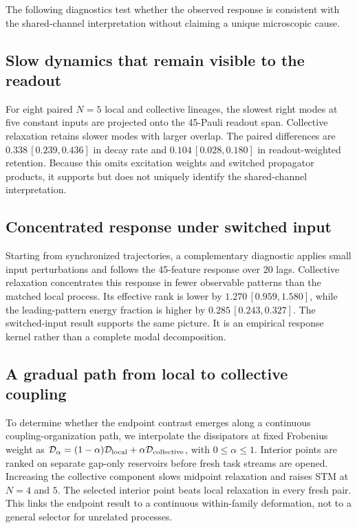 The following diagnostics test whether the observed response is consistent
with the shared-channel interpretation without claiming a unique microscopic
cause.

\subsection{Slow dynamics that remain visible to the readout}

For eight paired \(N=5\) local and collective lineages, the slowest right modes at five
constant inputs are projected onto the 45-Pauli readout span.  Collective
relaxation retains slower modes with larger overlap.  The paired differences
are \(0.338\,[0.239,0.436]\) in decay rate and
\(0.104\,[0.028,0.180]\) in readout-weighted retention. Because this omits
excitation weights and switched propagator products, it supports but does not
uniquely identify the shared-channel interpretation.

\subsection{Concentrated response under switched input}

Starting from synchronized trajectories, a complementary diagnostic applies
small input perturbations and follows the 45-feature response over 20 lags.
Collective relaxation concentrates this response in fewer observable
patterns than the matched local process.  Its effective rank is lower by
\(1.270\,[0.959,1.580]\), while the leading-pattern energy fraction is higher
by \(0.285\,[0.243,0.327]\).  The switched-input result supports the same
picture.  It is an empirical response kernel rather than a complete modal
decomposition.

\subsection{A gradual path from local to collective coupling}

To determine whether the endpoint contrast emerges along a continuous
coupling-organization path, we interpolate the dissipators at fixed Frobenius weight as
\(\mathcal{D}_\alpha=(1-\alpha)\mathcal{D}_{\mathrm{local}}
+\alpha\mathcal{D}_{\mathrm{collective}}\), with \(0\le\alpha\le1\).
Interior points are ranked on separate gap-only reservoirs before fresh task
streams are opened.  Increasing the collective component slows midpoint
relaxation and raises STM at \(N=4\) and \(5\).  The selected interior point
beats local relaxation in every fresh pair.  This links the endpoint result
to a continuous within-family deformation, not to a general selector for
unrelated processes.


